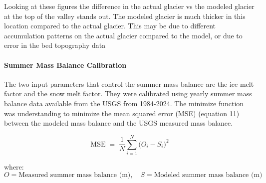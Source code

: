\documentclass{article}
\begin{document}
Looking at these figures the difference in the actual glacier vs the modeled glacier at the top of the valley stands out. The modeled glacier is much thicker in this 
location compared to the actual glacier. This may be due to different accumulation patterns on the actual glacier compared to the model, or due to error in the bed 
topography data

\paragraph{Summer Mass Balance Calibration}
The two input parameters that control the summer mass balance are the ice melt factor and the snow melt factor. They were calibrated using yearly summer 
mass balance data available from the USGS from 1984-2024. The minimize function was understanding
to minimize the mean squared error (MSE) (equation 11) between the modeled mass balance and the USGS measured mass balance. 

\begin{equation}
    \mathrm{MSE} \;=\; \frac{1}{N} \sum_{i=1}^{N} \bigl(O_i - S_i\bigr)^2
\end{equation}
    
\noindent where:
$$O = \text{Measured summer mass balance (m)}, \quad S=\text{Modeled summer mass balance (m)}$$
\end{document}
